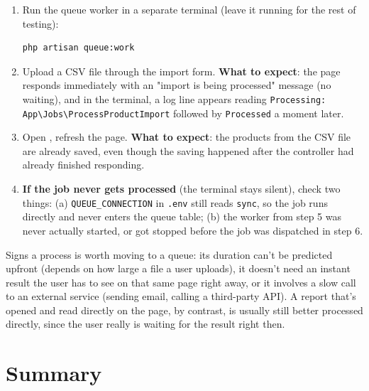 \begin{enumerate}
\begin{lstlisting}[language=php, title=\lstfile{app/Http/Controllers/ReportController.php}]
return back()->with('success', 'Import is being processed in the background.');
    \end{lstlisting}
  \item Run the queue worker in a separate terminal (leave it running
    for the rest of testing):
    \begin{lstlisting}[language=bash]
php artisan queue:work
    \end{lstlisting}
  \item Upload a CSV file through the import form. \textbf{What to
    expect}: the page responds immediately with an "import is being
    processed" message (no waiting), and in the 
    terminal, a log line appears reading
    \texttt{Processing: App\textbackslash{}Jobs\textbackslash{}ProcessProductImport}
    followed by \texttt{Processed} a moment later.
  \item Open , refresh the page. \textbf{What to
    expect}: the products from the CSV file are already saved, even
    though the saving happened after the controller had already
    finished responding.
  \item \textbf{If the job never gets processed} (the
     terminal stays silent), check two things: (a)
    \texttt{QUEUE\_CONNECTION} in \texttt{.env} still reads
    \texttt{sync}, so the job runs directly and never enters the queue
    table; (b) the worker from step 5 was never actually started, or
    got stopped before the job was dispatched in step 6.
\end{enumerate}

\begin{tipbox}
Signs a process is worth moving to a queue: its duration can't be
predicted upfront (depends on how large a file a user uploads), it
doesn't need an instant result the user has to see on that same page
right away, or it involves a slow call to an external service (sending
email, calling a third-party API). A report that's opened and read
directly on the page, by contrast, is usually still better processed
directly, since the user really is waiting for the result right then.
\end{tipbox}


\section{Summary}
\label{sec:pengolahan-data-rangkuman}

